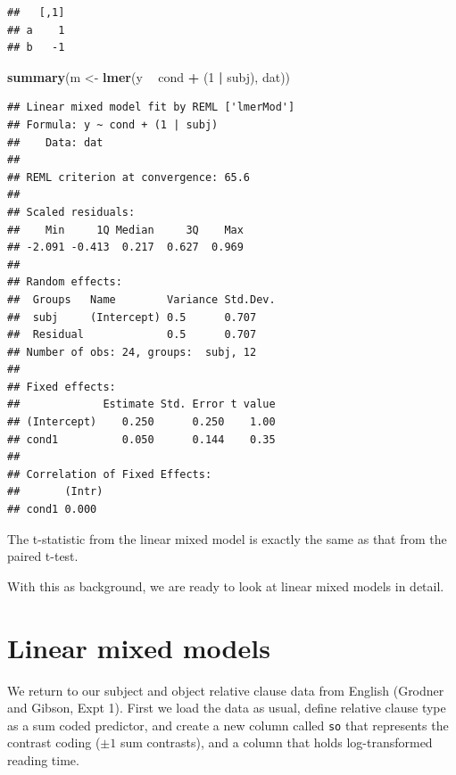 \documentclass[12pt,]{krantz}
\newenvironment{Shaded}{\begin{snugshade}}{\end{snugshade}}
\newcommand{\DataTypeTok}[1]{\textcolor[rgb]{0.13,0.29,0.53}{#1}}
\newcommand{\DecValTok}[1]{\textcolor[rgb]{0.00,0.00,0.81}{#1}}
\newcommand{\KeywordTok}[1]{\textcolor[rgb]{0.13,0.29,0.53}{\textbf{#1}}}
\newcommand{\NormalTok}[1]{#1}
\newcommand{\OperatorTok}[1]{\textcolor[rgb]{0.81,0.36,0.00}{\textbf{#1}}}
\newcommand{\OtherTok}[1]{\textcolor[rgb]{0.56,0.35,0.01}{#1}}
\newcommand{\StringTok}[1]{\textcolor[rgb]{0.31,0.60,0.02}{#1}}
\begin{document}
\begin{verbatim}
##   [,1]
## a    1
## b   -1
\end{verbatim}

\begin{Shaded}
\begin{Highlighting}[]
\KeywordTok{summary}\NormalTok{(m <-}\StringTok{ }\KeywordTok{lmer}\NormalTok{(y }\OperatorTok{~}\StringTok{ }\NormalTok{cond }\OperatorTok{+}\StringTok{ }\NormalTok{(}\DecValTok{1} \OperatorTok{|}\StringTok{ }\NormalTok{subj), dat))}
\end{Highlighting}
\end{Shaded}

\begin{verbatim}
## Linear mixed model fit by REML ['lmerMod']
## Formula: y ~ cond + (1 | subj)
##    Data: dat
## 
## REML criterion at convergence: 65.6
## 
## Scaled residuals: 
##    Min     1Q Median     3Q    Max 
## -2.091 -0.413  0.217  0.627  0.969 
## 
## Random effects:
##  Groups   Name        Variance Std.Dev.
##  subj     (Intercept) 0.5      0.707   
##  Residual             0.5      0.707   
## Number of obs: 24, groups:  subj, 12
## 
## Fixed effects:
##             Estimate Std. Error t value
## (Intercept)    0.250      0.250    1.00
## cond1          0.050      0.144    0.35
## 
## Correlation of Fixed Effects:
##       (Intr)
## cond1 0.000
\end{verbatim}

The t-statistic from the linear mixed model is exactly the same as that from the paired t-test.

With this as background, we are ready to look at linear mixed models in detail.

\hypertarget{linear-mixed-models}{%
\section{Linear mixed models}\label{linear-mixed-models}}

We return to our subject and object relative clause data from English (Grodner and Gibson, Expt 1). First we load the data as usual, define relative clause type as a sum coded predictor, and create a new column called \texttt{so} that represents the contrast coding (\(\pm 1\) sum contrasts), and a column that holds log-transformed reading time.

\begin{Shaded}
\end{Shaded}
\end{document}
